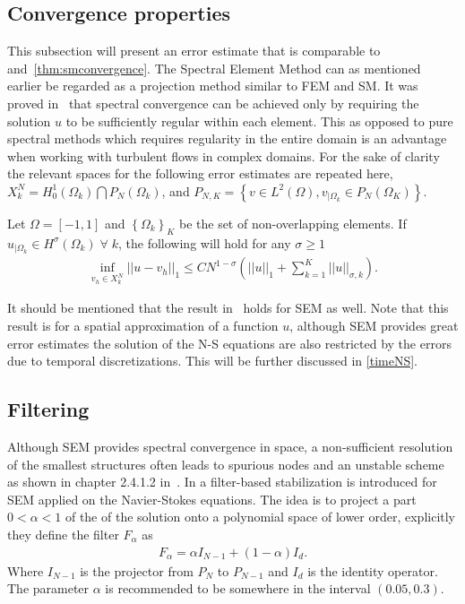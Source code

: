 
\subsection{Convergence properties}
This subsection will present an error estimate that is comparable
to  and~\ref{thm:smconvergence}.
The Spectral Element Method can as mentioned earlier be regarded as a projection 
method similar to FEM and SM. 
It was proved in~\cite{MPR1987} that spectral convergence can be achieved only by requiring the solution
$u$ to be sufficiently regular within each element. This as opposed to pure spectral methods which
requires regularity in the entire domain is an advantage when working with turbulent flows 
in complex domains.
For the sake of clarity the relevant spaces for the following error estimates are 
repeated here, $X^N_k =  H_0^1(\Omega_k)\bigcap P_N(\Omega_k)$, and 
$P_{N,K} = \left\{ v \in L^2(\Omega),v_{|\Omega_k} \in P_N(\Omega_K) \right\}$.
\begin{theorem}
    Let $\Omega = [-1,1]$ and $\left\{ \Omega_k \right\}_K$ be the set of non-overlapping elements. 
    If $u_{|\Omega_k} \in H^{\sigma}(\Omega_k)\; \forall \; k $, the following will hold for 
    any $\sigma \ge 1$
\begin{align}
    \inf_{v_{h}\in X_{k}^N}||u-v_h||_1 \le CN^{1-\sigma}\left( ||u||_1 + \sum_{k=1}^{K}||u||_{\sigma,k} \right).
\end{align}

    \label{thm:semconvergence}
\end{theorem}
%
It should be mentioned that the result in~ holds for SEM as well.
Note that this result is for a spatial approximation of a function $u$, although SEM provides 
great error estimates the solution of the N-S equations are also restricted by the errors due to 
temporal discretizations. This will be further discussed in \cref{timeNS}.
\subsection{Filtering} \label{filtering}
Although SEM provides spectral convergence in space,
a non-sufficient resolution of the smallest structures
often leads to spurious nodes and an unstable scheme 
as shown in chapter 2.4.1.2 in~\cite{Karniadakis}. In \cite{FischerMullen} a filter-based 
stabilization is introduced for SEM applied on 
the Navier-Stokes equations. The idea is to project a part $ 0 <\alpha < 1$ 
of the of the solution onto a polynomial space of lower order, 
explicitly they define the filter $F_{\alpha}$ as 
%
\begin{align}
    F_{\alpha}= \alpha I_{N-1}  + (1-\alpha) I_d.
    \label{eq:filter}
\end{align}
%
Where $I_{N-1}$ is the projector from $P_N$ to $P_{N-1}$ and $ I_d$ is the identity operator.
The parameter $\alpha$ is recommended to be somewhere in the interval $(0.05,0.3)$.

